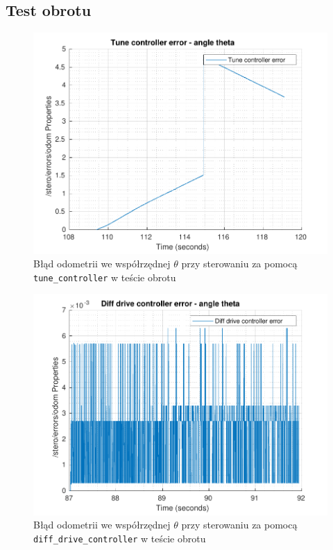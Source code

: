 \documentclass{mwrep}
\begin{document}
\newpage
\subsection{Test obrotu}
\label{pro1_figures_circle}

\begin{figure}[H]
	\centering
	\includegraphics[scale=0.85]{./figures/pro1/circle_tune/circle_tune_theta.pdf}
	\caption{Błąd odometrii we współrzędnej $\theta$ przy sterowaniu za pomocą \texttt{tune\_{controller}} w teście obrotu}
\end{figure}

\begin{figure}[H]
	\centering
	\includegraphics[scale=0.85]{./figures/pro1/circle_diff/circle_diff_theta.pdf}
	\caption{Błąd odometrii we współrzędnej $\theta$ przy sterowaniu za pomocą \texttt{diff\_{}drive\_{}controller} w teście obrotu}
\end{figure}
\newpage
\end{document}
